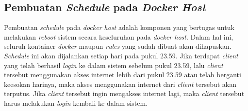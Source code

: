 \subsection{Pembuatan \textit{Schedule} pada \textit{Docker Host}}
Pembuatan \textit{schedule} pada \textit{docker host} adalah komponen yang bertugas untuk melakukan \textit{reboot} sistem secara keseluruhan pada \textit{docker host}. Dalam hal ini, seluruh kontainer \textit{docker} maupun \textit{rules} yang sudah dibuat akan dihapuskan. \textit{Schedule} ini akan dijalankan setiap hari pada pukul 23.59. Jika terdapat \textit{client} yang telah berhasil \textit{login} ke dalam sistem sebelum pukul 23.59, lalu \textit{client} tersebut menggunakan akses internet lebih dari pukul 23.59 atau telah berganti keesokan harinya, maka akses menggunakan internet dari \textit{client} tersebut akan terputus. Jika \textit{client} tersebut ingin mengakses internet lagi, maka \textit{client} tersebut harus melakukan \textit{login} kembali ke dalam sistem.